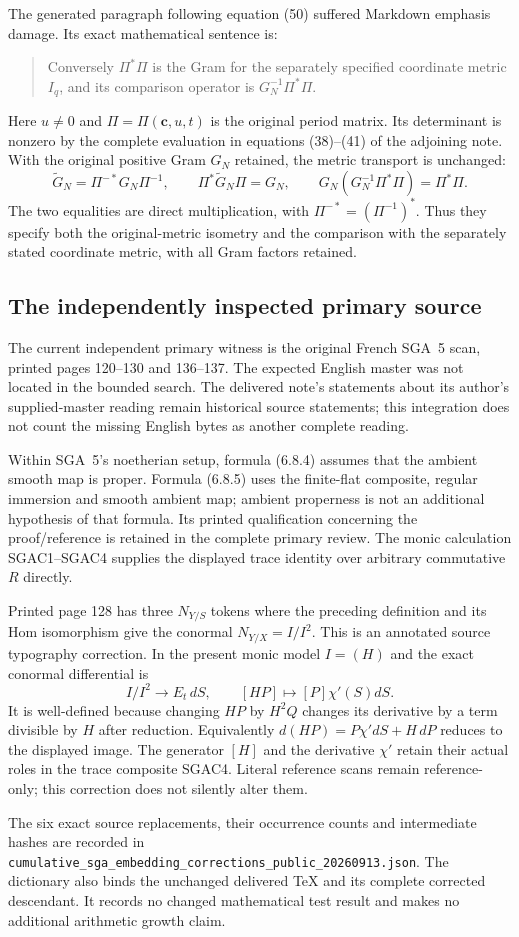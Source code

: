 \documentclass{article}
\begin{document}
The generated paragraph following equation (50) suffered Markdown
emphasis damage.  Its exact mathematical sentence is:
\begin{quote}
Conversely $\Pi^*\Pi$ is the Gram for the separately specified
coordinate metric $I_q$, and its comparison operator is
$G_N^{-1}\Pi^*\Pi$.
\end{quote}
Here $u\ne0$ and $\Pi=\Pi(\mathbf c,u,t)$ is the original period
matrix.  Its determinant is nonzero by the complete evaluation in
equations (38)--(41) of the adjoining note.  With the original positive
Gram $G_N$ retained, the metric transport is unchanged:
\[
 \widetilde G_N=\Pi^{-*}G_N\Pi^{-1},\qquad
 \Pi^*\widetilde G_N\Pi=G_N,
 \qquad G_N(G_N^{-1}\Pi^*\Pi)=\Pi^*\Pi.
 \tag{SGAC7}
\]
The two equalities are direct multiplication, with
$\Pi^{-*}=(\Pi^{-1})^*$.  Thus they specify both the original-metric
isometry and the comparison with the separately stated coordinate
metric, with all Gram factors retained.

\subsection{The independently inspected primary source}

The current independent primary witness is the original French
SGA~5 scan, printed pages 120--130 and 136--137.  The expected English
master was not located in the bounded search.  The delivered note's
statements about its author's supplied-master reading remain historical
source statements; this integration does not count the missing English
bytes as another complete reading.

Within SGA~5's noetherian setup, formula (6.8.4) assumes that the
ambient smooth map is proper.  Formula (6.8.5) uses the finite-flat
composite, regular immersion and smooth ambient map; ambient properness
is not an additional hypothesis of that formula.  Its printed
qualification concerning the proof/reference is retained in the
complete primary review.  The monic calculation SGAC1--SGAC4 supplies
the displayed trace identity over arbitrary commutative $R$ directly.

Printed page 128 has three $N_{Y/S}$ tokens where the preceding
definition and its Hom isomorphism give the conormal
$N_{Y/X}=I/I^2$.  This is an annotated source typography correction.
In the present monic model $I=(H)$ and the exact conormal differential is
\[
 I/I^2\longrightarrow E_t\,dS,\qquad
 [H P]\longmapsto[P]\chi'(S)dS.
 \tag{SGAC8}
\]
It is well-defined because changing $HP$ by $H^2Q$ changes its
derivative by a term divisible by $H$ after reduction.  Equivalently
$d(HP)=P\chi'dS+H\,dP$ reduces to the displayed image.  The
generator $[H]$ and the derivative $\chi'$ retain their actual
roles in the trace composite SGAC4.  Literal reference scans remain
reference-only; this correction does not silently alter them.

The six exact source replacements, their occurrence counts and
intermediate hashes are recorded in
\nolinkurl{cumulative_sga_embedding_corrections_public_20260913.json}.
The dictionary also binds the unchanged delivered TeX and its complete
corrected descendant.  It records no changed mathematical test result
and makes no additional arithmetic growth claim.
\end{document}
